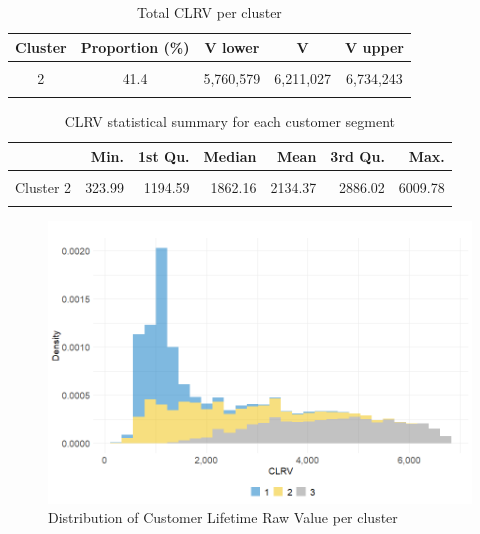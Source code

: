 \documentclass[
]{book}
\begin{document}
\begin{table}[H]

\caption{\label{tab:totValclust}Total CLRV per cluster}
\centering
\begin{tabular}[t]{ccccc}
\toprule
Cluster & Proportion (\%) & V lower & V & V upper\\
\midrule
\cellcolor{gray!6}{1} & \cellcolor{gray!6}{26.6} & \cellcolor{gray!6}{2,035,928} & \cellcolor{gray!6}{2,117,932} & \cellcolor{gray!6}{2,213,746}\\
2 & 41.4 & 5,760,579 & 6,211,027 & 6,734,243\\
\cellcolor{gray!6}{3} & \cellcolor{gray!6}{32.1} & \cellcolor{gray!6}{9,807,637} & \cellcolor{gray!6}{9,941,041} & \cellcolor{gray!6}{10,083,660}\\
\bottomrule
\end{tabular}
\end{table}

\begin{table}[H]

\caption{\label{tab:custValuesclust}CLRV statistical summary for each customer segment}
\centering
\begin{tabular}[t]{lrrrrrr}
\toprule
  & Min. & 1st Qu. & Median & Mean & 3rd Qu. & Max.\\
\midrule
\cellcolor{gray!6}{Cluster 1} & \cellcolor{gray!6}{333.82} & \cellcolor{gray!6}{837.50} & \cellcolor{gray!6}{1094.51} & \cellcolor{gray!6}{1134.40} & \cellcolor{gray!6}{1264.28} & \cellcolor{gray!6}{4679.80}\\
Cluster 2 & 323.99 & 1194.59 & 1862.16 & 2134.37 & 2886.02 & 6009.78\\
\cellcolor{gray!6}{Cluster 3} & \cellcolor{gray!6}{1268.74} & \cellcolor{gray!6}{3393.93} & \cellcolor{gray!6}{4489.62} & \cellcolor{gray!6}{4408.44} & \cellcolor{gray!6}{5454.71} & \cellcolor{gray!6}{6815.42}\\
\bottomrule
\end{tabular}
\end{table}

\begin{figure}

{\centering \includegraphics[width=12.5in]{./imgs/clrv_density_per_cluster} 

}

\caption{Distribution of Customer Lifetime Raw Value per cluster}\label{fig:clrvDensClust}
\end{figure}
\end{document}
